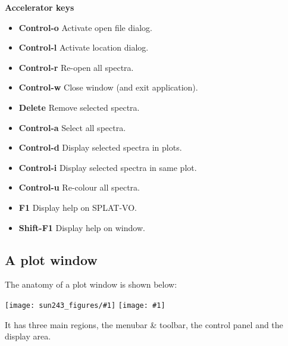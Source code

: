 \documentclass[twoside,11pt,nolof]{starlink}
\providecommand{\SPLAT}{\textsf{SPLAT-VO}}
\providecommand{\mainfigure}[1]
{\begin{center}
    \ifpdf
    \texttt{[image: sun243\_figures/\#1]}
    \else
    \texttt{[image: \#1]}
    \fi
 \end{center}
}
\newcommand{\labelitem}[1]{\textbf{#1}}
\providecommand{\subheading}[1]{\textbf{\large{#1}}}
\begin{document}
\subheading{Accelerator keys}

\begin{itemize}
\item \labelitem{Control-o} Activate open file dialog.
\item \labelitem{Control-l} Activate location dialog.
\item \labelitem{Control-r} Re-open all spectra.
\item \labelitem{Control-w} Close window (and exit application).
\item \labelitem{Delete} Remove selected spectra.
\item \labelitem{Control-a} Select all spectra.
\item \labelitem{Control-d} Display selected spectra in plots.
\item \labelitem{Control-i} Display selected spectra in same plot.
\item \labelitem{Control-u} Re-colour all spectra.
\item \labelitem{F1} Display help on \SPLAT.
\item \labelitem{Shift-F1} Display help on window.
\end{itemize}

\newpage
\subsection{A plot window}

The anatomy of a plot window is shown below:

\mainfigure{plot3}

It has three main regions, the menubar \& toolbar, the control panel and
the display area.\\
\end{document}
